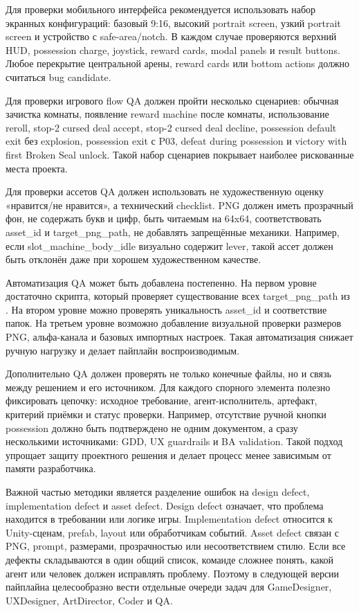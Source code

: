 \documentclass[a4paper,12pt]{report}
\newcommand{\file}[1]{\path{#1}}
\begin{document}
Для проверки мобильного интерфейса рекомендуется использовать набор экранных конфигураций: базовый 9:16, высокий portrait screen, узкий portrait screen и устройство с safe-area/notch. В каждом случае проверяются верхний HUD, possession charge, joystick, reward cards, modal panels и result buttons. Любое перекрытие центральной арены, reward cards или bottom actions должно считаться bug candidate.

Для проверки игрового flow QA должен пройти несколько сценариев: обычная зачистка комнаты, появление reward machine после комнаты, использование reroll, stop-2 cursed deal accept, stop-2 cursed deal decline, possession default exit без explosion, possession exit с P03, defeat during possession и victory with first Broken Seal unlock. Такой набор сценариев покрывает наиболее рискованные места проекта.

Для проверки ассетов QA должен использовать не художественную оценку «нравится/не нравится», а технический checklist. PNG должен иметь прозрачный фон, не содержать букв и цифр, быть читаемым на 64x64, соответствовать asset\_id и target\_png\_path, не добавлять запрещённые механики. Например, если slot\_machine\_body\_idle визуально содержит lever, такой ассет должен быть отклонён даже при хорошем художественном качестве.

Автоматизация QA может быть добавлена постепенно. На первом уровне достаточно скрипта, который проверяет существование всех target\_png\_path из \file{asset_prompts.csv}. На втором уровне можно проверять уникальность asset\_id и соответствие папок. На третьем уровне возможно добавление визуальной проверки размеров PNG, альфа-канала и базовых импортных настроек. Такая автоматизация снижает ручную нагрузку и делает пайплайн воспроизводимым.

Дополнительно QA должен проверять не только конечные файлы, но и связь между решением и его источником. Для каждого спорного элемента полезно фиксировать цепочку: исходное требование, агент-исполнитель, артефакт, критерий приёмки и статус проверки. Например, отсутствие ручной кнопки possession должно быть подтверждено не одним документом, а сразу несколькими источниками: GDD, UX guardrails и BA validation. Такой подход упрощает защиту проектного решения и делает процесс менее зависимым от памяти разработчика.

Важной частью методики является разделение ошибок на design defect, implementation defect и asset defect. Design defect означает, что проблема находится в требовании или логике игры. Implementation defect относится к Unity-сценам, prefab, layout или обработчикам событий. Asset defect связан с PNG, prompt, размерами, прозрачностью или несоответствием стилю. Если все дефекты складываются в один общий список, команде сложнее понять, какой агент или человек должен исправлять проблему. Поэтому в следующей версии пайплайна целесообразно вести отдельные очереди задач для GameDesigner, UXDesigner, ArtDirector, Coder и QA.
\end{document}
